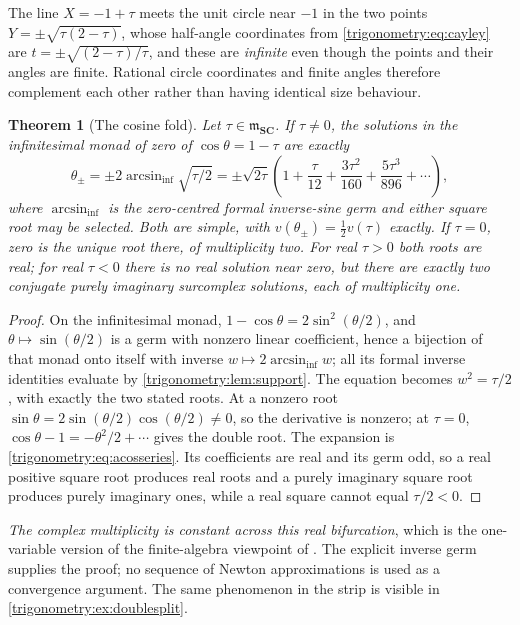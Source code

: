 \documentclass[11pt,letterpaper]{article}
\numberwithin{equation}{section}
\newtheorem{theorem}{Theorem}[section]
\theoremstyle{definition}
\theoremstyle{remark}
\newcommand{\SC}{\mathbf{SC}}
\newcommand{\mm}{\mathfrak m}
\begin{document}
\begin{example}\label{trigonometry:ex:infinitetangent}
The line $X=-1+\tau$ meets the unit circle near $-1$ in the two points
$Y=\pm\sqrt{\tau(2-\tau)}$, whose half-angle coordinates from \cref{trigonometry:eq:cayley} are
$t=\pm\sqrt{(2-\tau)/\tau}$, and these are \emph{infinite} even though the points and their angles
are finite. Rational circle coordinates and finite angles therefore complement each other rather
than having identical size behaviour.
\end{example}

\begin{theorem}[The cosine fold]\label{trigonometry:thm:fold}
Let $\tau\in\mm_{\SC}$. If $\tau\ne0$, the solutions in the infinitesimal monad of zero of
$\cos\theta=1-\tau$ are exactly
\begin{equation}\label{trigonometry:eq:foldroots}
 \theta_\pm=\pm2\arcsin_{\mathrm{inf}}\sqrt{\tau/2}
 =\pm\sqrt{2\tau}\left(1+\frac\tau{12}+\frac{3\tau^2}{160}+\frac{5\tau^3}{896}+\cdots\right),
\end{equation}
where $\arcsin_{\mathrm{inf}}$ is the zero-centred formal inverse-sine germ and either square root
may be selected. Both are simple, with $v(\theta_\pm)=\tfrac12v(\tau)$ exactly. If $\tau=0$, zero
is the unique root there, of multiplicity two. For real $\tau>0$ both roots are real; for real
$\tau<0$ there is no real solution near zero, but there are exactly two conjugate purely imaginary
surcomplex solutions, each of multiplicity one.
\end{theorem}
\begin{proof}
On the infinitesimal monad, $1-\cos\theta=2\sin^2(\theta/2)$, and $\theta\mapsto\sin(\theta/2)$ is
a germ with nonzero linear coefficient, hence a bijection of that monad onto itself with inverse
$w\mapsto2\arcsin_{\mathrm{inf}}w$; all its formal inverse identities evaluate by
\cref{trigonometry:lem:support}. The equation becomes $w^2=\tau/2$, with exactly the two stated
roots. At a nonzero root $\sin\theta=2\sin(\theta/2)\cos(\theta/2)\ne0$, so the derivative is
nonzero; at $\tau=0$, $\cos\theta-1=-\theta^2/2+\cdots$ gives the double root. The expansion is
\cref{trigonometry:eq:acosseries}. Its coefficients are real and its germ odd, so a real positive
square root produces real roots and a purely imaginary square root produces purely imaginary ones,
while a real square cannot equal $\tau/2<0$.
\end{proof}
\emph{The complex multiplicity is constant across this real bifurcation}, which is the one-variable
version of the finite-algebra viewpoint of \cite{SourceGeometry}. The explicit inverse germ
supplies the proof; no sequence of Newton approximations is used as a convergence argument. The
same phenomenon in the strip is visible in \cref{trigonometry:ex:doublesplit}.
\end{document}
